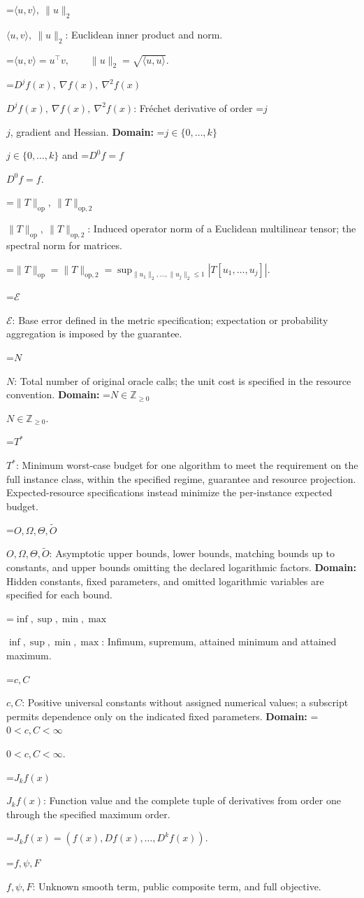 \documentclass[10pt,a4paper]{article}
\newcommand{\AtlasMath}[1]{\par\begingroup\centering\setbox0=\hbox{$\displaystyle #1$}\ifdim\wd0>1.4\linewidth\typeout{ATLAS WIDE FORMULA: \the\wd0}\fi\ifdim\wd0>\linewidth\resizebox{\linewidth}{!}{\box0}\else\box0\fi\par\endgroup}
\newcommand{\AtlasInlineMath}[1]{\begingroup\setbox0=\hbox{$#1$}\ifdim\wd0>.4\linewidth\endgroup\AtlasMath{#1}\else\endgroup$#1$\fi}
\begin{document}
\AtlasInlineMath{\langle u,v\rangle,\ \|u\|_2}: Euclidean inner product and norm.


\AtlasMath{\langle u,v\rangle=u^\top v,\qquad\|u\|_2=\sqrt{\langle u,u\rangle}.}


\AtlasInlineMath{D^jf(x),\ \nabla f(x),\ \nabla^2f(x)}: Fréchet derivative of order \AtlasInlineMath{j}, gradient and Hessian. \textbf{Domain:} \AtlasInlineMath{j\in\{0,\ldots,k\}} and \AtlasInlineMath{D^0f=f}.

\AtlasInlineMath{\|T\|_{\mathrm{op}},\ \|T\|_{\mathrm{op},2}}: Induced operator norm of a Euclidean multilinear tensor; the spectral norm for matrices.


\AtlasMath{\|T\|_{\mathrm{op}}=\|T\|_{\mathrm{op},2}=\sup_{\|u_1\|_2,\ldots,\|u_j\|_2\le1}|T[u_1,\ldots,u_j]|.}


\AtlasInlineMath{\mathcal{E}}: Base error defined in the metric specification; expectation or probability aggregation is imposed by the guarantee.

\AtlasInlineMath{N}: Total number of original oracle calls; the unit cost is specified in the resource convention. \textbf{Domain:} \AtlasInlineMath{N\in\mathbb{Z}_{\ge0}}.

\AtlasInlineMath{T^*}: Minimum worst-case budget for one algorithm to meet the requirement on the full instance class, within the specified regime, guarantee and resource projection. Expected-resource specifications instead minimize the per-instance expected budget.

\AtlasInlineMath{O,\Omega,\Theta,\widetilde{O}}: Asymptotic upper bounds, lower bounds, matching bounds up to constants, and upper bounds omitting the declared logarithmic factors. \textbf{Domain:} Hidden constants, fixed parameters, and omitted logarithmic variables are specified for each bound.

\AtlasInlineMath{\inf,\sup,\min,\max}: Infimum, supremum, attained minimum and attained maximum.

\AtlasInlineMath{c,C}: Positive universal constants without assigned numerical values; a subscript permits dependence only on the indicated fixed parameters. \textbf{Domain:} \AtlasInlineMath{0<c,C<\infty}.

\AtlasInlineMath{J_{k}f(x)}: Function value and the complete tuple of derivatives from order one through the specified maximum order.


\AtlasMath{J_{k}f(x)=(f(x),Df(x),\ldots,D^{k}f(x)).}


\AtlasInlineMath{f,\psi,F}: Unknown smooth term, public composite term, and full objective.
\end{document}
